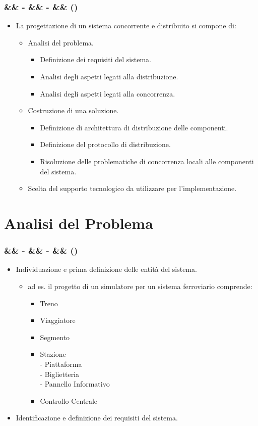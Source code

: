 \documentclass[slidestop,compress,blackandwhite]{beamer}
\newcommand{\cm}[1]{\vspace{#1cm}}
\newcommand{\newtitle}[4]{
	#1 
	\ifx&#2&%
	\else
  		\large- #2
	\fi
	\ifx&#3&%
	\else
  		\small- #3
	\fi
	\ifx&#4&%
	\else
  		\normalsize (#4)
	\fi
}
\newcommand{\newframe}[5]{
	\begin{frame}
		\frametitle{\newtitle{#1}{#2}{#3}{#4}}
		#5
	\end{frame}
}
\newcommand{\myitemize}[1]{
	\begin{itemize}\itemsep4pt
	#1
	\end{itemize}
}
\begin{document}
	\newframe{}{}{}{}{
		
		\myitemize {
			\item La progettazione di un sistema concorrente e distribuito si compone di:
				\cm{0.2}
				\myitemize {
					\item Analisi del problema.
						\myitemize {
							\item Definizione dei requisiti del sistema.
							\item Analisi degli aspetti legati alla distribuzione.
							\item Analisi degli aspetti legati alla concorrenza.
						}
					\item Costruzione di una soluzione.
						\myitemize {
							\item Definizione di architettura di distribuzione delle componenti.
							\item Definizione del protocollo di distribuzione.
							\item Risoluzione delle problematiche di concorrenza locali alle componenti del sistema.
						}
					\item Scelta del supporto tecnologico da utilizzare per l'implementazione.
				}
		}
	}

\section{Analisi del Problema}\label{analisis}
	\newframe{}{}{}{}{
		\myitemize {
			\item Individuazione e prima definizione delle entità del sistema.
				\myitemize {
					\item ad es. il progetto di un simulatore per un sistema ferroviario comprende:
						\myitemize{
							\item Treno
							\item Viaggiatore
							\item Segmento
							\item Stazione\\\cm{0.1}
								- Piattaforma\\ \cm{0.1}
								- Biglietteria\\ \cm{0.1}
								- Pannello Informativo
							\item Controllo Centrale
						}
				}
			\item Identificazione e definizione dei requisiti del sistema.
		}
	}
	
\end{document}
